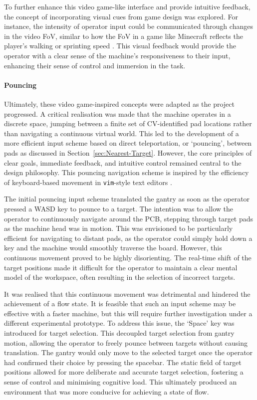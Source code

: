 \documentclass[12pt,british,UKenglish]{article}
\begin{document}
To further enhance this video game-like interface and provide intuitive feedback, the concept of incorporating visual cues from game design was explored.
For instance, the intensity of operator input could be communicated through changes in the video \ac{FoV}, similar to how the \ac{FoV} in a game like Minecraft reflects the player's walking or sprinting speed \cite{fandomSprinting}.
This visual feedback would provide the operator with a clear sense of the machine's responsiveness to their input, enhancing their sense of control and immersion in the task.

\paragraph{Pouncing}
Ultimately, these video game-inspired concepts were adapted as the project progressed.
A critical realisation was made that the machine operates in a discrete space, jumping between a finite set of \ac{CV}-identified pad locations rather than navigating a continuous virtual world.
This led to the development of a more efficient input scheme based on direct teleportation, or `pouncing', between pads as discussed in Section~\ref{sec:Nearest-Target}.
However, the core principles of clear goals, immediate feedback, and intuitive control remained central to the design philosophy.
This pouncing navigation scheme is inspired by the efficiency of keyboard-based movement in \texttt{vim}-style text editors \cite{10.31510/infa.v17i2.1066}.

The initial pouncing input scheme translated the gantry as soon as the operator pressed a WASD key to pounce to a target.
The intention was to allow the operator to continuously navigate around the \ac{PCB}, stepping through target pads as the machine head was in motion.
This was envisioned to be particularly efficient for navigating to distant pads, as the operator could simply hold down a key and the machine would smoothly traverse the board.
However, this continuous movement proved to be highly disorienting.
The real-time shift of the target positions made it difficult for the operator to maintain a clear mental model of the workspace, often resulting in the selection of incorrect targets.

It was realised that this continuous movement was detrimental and hindered the achievement of a flow state.
It is feasible that such an input scheme may be effective with a faster machine, but this will require further investigation under a different experimental prototype.
To address this issue, the `Space' key was introduced for target selection.
This decoupled target selection from gantry motion, allowing the operator to freely pounce between targets without causing translation.
The gantry would only move to the selected target once the operator had confirmed their choice by pressing the spacebar.
The static field of target positions allowed for more deliberate and accurate target selection, fostering a sense of control and minimising cognitive load.
This ultimately produced an environment that was more conducive for achieving a state of flow.
\end{document}
